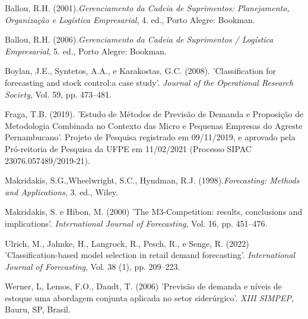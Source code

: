 \documentclass[11pt,letterpaper,twocolumn]{article}
\begin{document}
\begin{thebibliography}{9}

Ballou, R.H. (2001).{\it Gerenciamento da Cadeia de Suprimentos: Planejamento, Organização e Logística Empresarial}, 4. ed., Porto Alegre: Bookman.

Ballou, R.H. (2006).{\it Gerenciamento da Cadeia de Suprimentos / Logística Empresarial}, 5. ed., Porto Alegre: Bookman.

Boylan, J.E., Syntetos, A.A., e Karakostas, G.C. (2008). 'Classification for forecasting and stock control:a case study'. {\it Journal of the Operational Research Society}, Vol. 59, pp. 473--481.

Fraga, T.B. (2019). 'Estudo de Métodos de Previsão de Demanda e Proposição de Metodologia Combinada no Contexto das Micro e Pequenas
Empresas do Agreste Pernambucano'. Projeto de Pesquisa registrado em 09/11/2019, e aprovado pela Pró-reitoria de Pesquisa da UFPE em 11/02/2021 (Processo SIPAC 23076.057489/2019-21).

Makridakis, S.G.,Wheelwright, S.C., Hyndman, R.J. (1998).{\it Forecasting: Methods and Applications}, 3. ed., Wiley.

Makridakis, S. e Hibon, M. (2000) 'The M3-Competition: results, conclusions and implications'. {\it International Journal of Forecasting}, Vol. 16, pp. 451--476.

Ulrich, M., Jahnke, H., Langrock, R., Pesch, R., e Senge, R. (2022) 'Classification-based model selection in retail demand forecasting'. {\it International Journal of Forecasting}, Vol. 38 (1), pp. 209--223.

Werner, L, Lemos, F.O., Daudt, T. (2006) 'Previsão de demanda e níveis de estoque uma abordagem conjunta aplicada no setor siderúrgico'. {\it XIII SIMPEP}, Bauru, SP, Brasil.


\end{thebibliography} 
\end{document}
